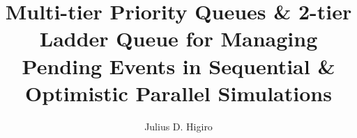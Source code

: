 \documentclass{article}
\title{Multi-tier Priority Queues \& 2-tier Ladder Queue for Managing Pending Events in Sequential \& Optimistic Parallel Simulations}
\author{Julius D. Higiro}
\begin{document}








\pagebreak


\end{document}

